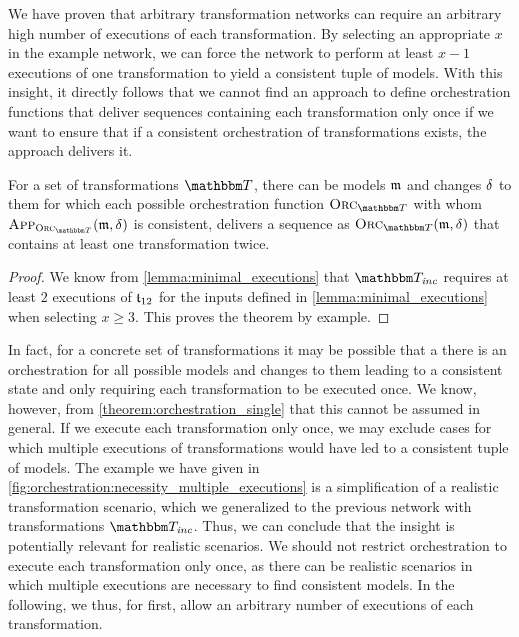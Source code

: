 We have proven that arbitrary transformation networks can require an arbitrary high number of executions of each transformation.
By selecting an appropriate $x$ in the example network, we can force the network to perform at least $x-1$ executions of one transformation to yield a consistent tuple of models.
With this insight, it directly follows that we cannot find an approach to define orchestration functions that deliver sequences containing each transformation only once if we want to ensure that if a consistent orchestration of transformations exists, the approach delivers it.

\begin{theorem}
    \label{theorem:orchestration_single}
    For a set of transformations $\transformationset{T}$, there can be models $\mathfrak{m}$ and changes $\mathfrak{\delta}_{}$ to them for which each possible orchestration function $\orcfunction{\transformationset{T}}$ with whom $\appfunction{\orcfunction{\transformationset{T}}}(\modeltuple{m}, \changetuple{})$ is consistent, delivers a sequence as $\orcfunction{\transformationset{T}}(\modeltuple{m}, \changetuple{})$ that contains at least one transformation twice.
\end{theorem}
\begin{proof}
    We know from \autoref{lemma:minimal_executions} that $\transformationset{T}_\mathvariable{inc}$ requires at least $2$ executions of $\mathfrak{t}_{12}$ for the inputs defined in \autoref{lemma:minimal_executions} when selecting $x \geq 3$.
    This proves the theorem by example.
\end{proof}

In fact, for a concrete set of transformations it may be possible that a there is an orchestration for all possible models and changes to them leading to a consistent state and only requiring each transformation to be executed once.
We know, however, from \autoref{theorem:orchestration_single} that this cannot be assumed in general.
If we execute each transformation only once, we may exclude cases for which multiple executions of transformations would have led to a consistent tuple of models.
The example we have given in \autoref{fig:orchestration:necessity_multiple_executions} is a simplification of a realistic transformation scenario, which we generalized to the previous network with transformations $\transformationset{T}_\mathvariable{inc}$.
Thus, we can conclude that the insight is potentially relevant for realistic scenarios.
We should not restrict orchestration to execute each transformation only once, as there can be realistic scenarios in which multiple executions are necessary to find consistent models.
In the following, we thus, for first, allow an arbitrary number of executions of each transformation.

